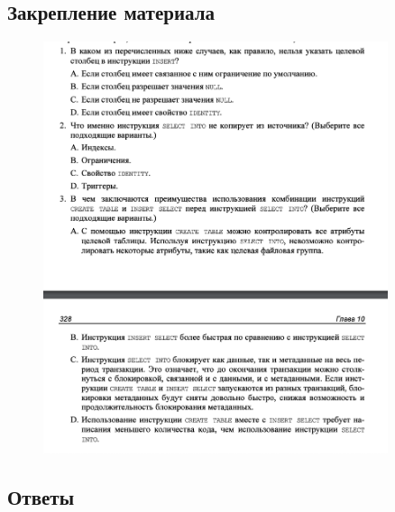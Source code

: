 \subsection*{Закрепление материала}

\begin{figure}[h!]
	\begin{center}
		\includegraphics[width=0.9\textwidth]{img/zakrep20.png}
	\end{center}
	\captionsetup{justification=centering}
\end{figure}
\clearpage

\subsection*{Ответы}

